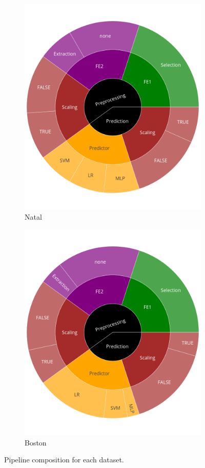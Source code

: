 \begin{figure}
  	\begin{subfigure}[t]{0.3\textwidth}
    \centering\includegraphics[width=\textwidth]{img/sunburst/natal.png}
    \caption{Natal}
  	\end{subfigure}
	\begin{subfigure}[t]{0.3\textwidth}
    \centering\includegraphics[width=\textwidth]{img/sunburst/boston.png}
    \caption{Boston}
  	\end{subfigure}

    \caption{Pipeline composition for each dataset.}
    \label{fig:dataset_composition}
\end{figure}